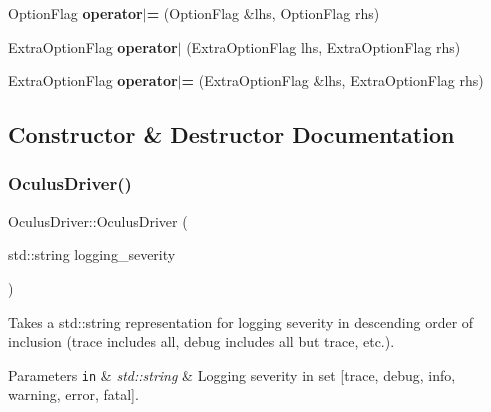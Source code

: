 \begin{DoxyCompactItemize}
\mbox{\label{classOculusDriver_ab2cb1c54a6cf5b59f95fa5cc44e3bc47}} 
Option\+Flag {\bfseries operator$\vert$=} (Option\+Flag \&lhs, Option\+Flag rhs)
\item 
\mbox{\label{classOculusDriver_a113503b6913447641fbd3e2a00fedcbd}} 
Extra\+Option\+Flag {\bfseries operator$\vert$} (Extra\+Option\+Flag lhs, Extra\+Option\+Flag rhs)
\item 
\mbox{\label{classOculusDriver_ab6d2d558d74f5c1ac5efc949771a1449}} 
Extra\+Option\+Flag {\bfseries operator$\vert$=} (Extra\+Option\+Flag \&lhs, Extra\+Option\+Flag rhs)
\end{DoxyCompactItemize}


\subsection{Constructor \& Destructor Documentation}
\mbox{\label{classOculusDriver_a375971727905f97e740960404d344650}} 
\subsubsection{\texorpdfstring{Oculus\+Driver()}{OculusDriver()}}
{\footnotesize\ttfamily Oculus\+Driver\+::\+Oculus\+Driver (\begin{DoxyParamCaption}\item[{std\+::string}]{logging\+\_\+severity }\end{DoxyParamCaption})}

Takes a std\+::string representation for logging severity in descending order of inclusion (trace includes all, debug includes all but trace, etc.).


\begin{DoxyParams}[1]{Parameters}
\mbox{\tt in}  & {\em std\+::string} & Logging severity in set \mbox{[}trace, debug, info, warning, error, fatal\mbox{]}. \\
\hline
\end{DoxyParams}
\mbox{\label{classOculusDriver_aa5a4dc2ce813dd838fcea5713ae801d7}} 
